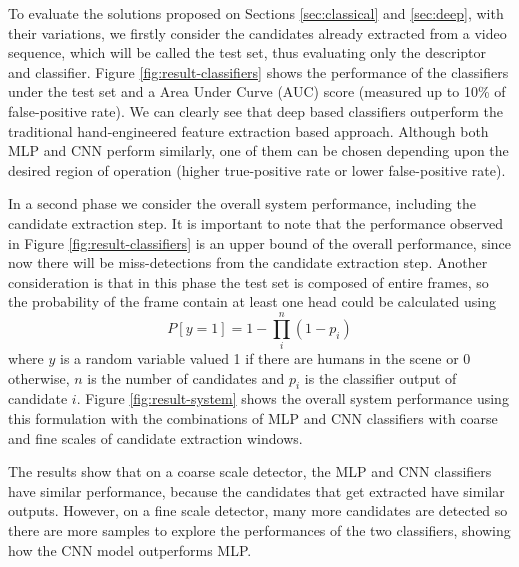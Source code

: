     To evaluate the solutions proposed on Sections \ref{sec:classical} and \ref{sec:deep}, with their variations, we firstly consider the candidates already extracted from a video sequence, which will be called the test set, thus evaluating only the descriptor and classifier. Figure \ref{fig:result-classifiers} shows the performance of the classifiers under the test set and a Area Under Curve (AUC) score \cite{evaluationMetrics} (measured up to 10\% of false-positive rate). We can clearly see that deep based classifiers outperform the traditional hand-engineered feature extraction based approach. Although both MLP and CNN perform similarly, one of them can be chosen depending upon the desired region of operation (higher true-positive rate or lower false-positive rate).

    \begin{figure*}[!t]
    \centering
    \label{fig:result-classifiers-all}
    \hfil
    \label{fig:result-classifiers-all-zoom}
    \caption{Classifiers performance.}
    \label{fig:result-classifiers}
    \end{figure*}

    In a second phase we consider the overall system performance, including the candidate extraction step. It is important to note that the performance observed in Figure \ref{fig:result-classifiers} is an upper bound of the overall performance, since now there will be miss-detections from the candidate extraction step. Another consideration is that in this phase the test set is composed of entire frames, so the probability of the frame contain at least one head could be calculated using
    \begin{equation}
    P[y=1] = 1 - \prod_i^n (1-p_i)
    \end{equation}
    where $y$ is a random variable valued 1 if there are humans in the scene or 0 otherwise, $n$ is the number of candidates and $p_i$ is the classifier output of candidate $i$. Figure \ref{fig:result-system} shows the overall system performance using this formulation with the combinations of MLP and CNN classifiers with coarse and fine scales of candidate extraction windows.

    The results show that on a coarse scale detector, the MLP and CNN classifiers have similar performance, because the candidates that get extracted have similar outputs. However, on a fine scale detector, many more candidates are detected so there are more samples to explore the performances of the two classifiers, showing how the CNN model outperforms MLP.

